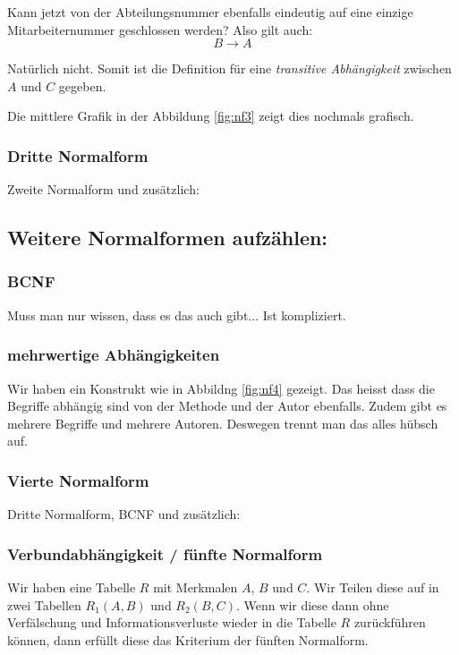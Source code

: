 Kann jetzt von der Abteilungsnummer ebenfalls eindeutig auf eine einzige Mitarbeiternummer geschlossen werden? Also gilt auch:
\begin{equation*}
    B\rightarrow A
\end{equation*}

Natürlich nicht. Somit ist die Definition für eine \emph{transitive Abhängigkeit} zwischen \(A\) und \(C\) gegeben.

Die mittlere Grafik in der Abbildung \ref{fig:nf3} zeigt dies nochmals grafisch.

\subsubsection{Dritte Normalform}
Zweite Normalform und zusätzlich:
\begin{center}
\end{center}

\subsection{Weitere Normalformen aufzählen:}

\subsubsection{BCNF}
Muss man nur wissen, dass es das auch gibt... Ist kompliziert.

\subsubsection{mehrwertige Abhängigkeiten}

Wir haben ein Konstrukt wie in Abbildng \ref{fig:nf4} gezeigt. Das heisst dass die Begriffe abhängig sind von der Methode und der Autor ebenfalls. Zudem gibt es mehrere Begriffe und mehrere Autoren. Deswegen trennt man das alles hübsch auf.
\subsubsection{Vierte Normalform}
Dritte Normalform, BCNF und zusätzlich:
\begin{center}
\end{center}

\subsubsection{Verbundabhängigkeit / fünfte Normalform}
Wir haben eine Tabelle \(R\) mit Merkmalen \(A\), \(B\) und \(C\). Wir Teilen diese auf in zwei Tabellen \(R_{1}(A,B)\) und \(R_{2}(B,C)\). Wenn wir diese dann ohne Verfälschung und Informationsverluste wieder in die Tabelle \(R\) zurückführen können, dann erfüllt diese das Kriterium der fünften Normalform.